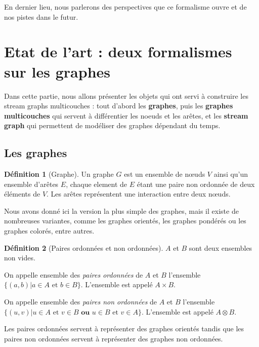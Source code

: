 \documentclass[11pt,a4paper]{article}
\theoremstyle{definition}
\newtheorem{defn}{Définition}
\theoremstyle{remark}
\theoremstyle{remark}
\def \stg {stream graph}
\def \stgms {stream graphs multicouches}
\begin{document}
	En dernier lieu, nous parlerons des perspectives que ce formalisme ouvre et de nos pistes dans le futur.
	
	
	
\section{Etat de l'art : deux formalismes sur les graphes}
\indent

Dans cette partie, nous allons présenter les objets qui ont servi à construire les \stgms{} : tout d'abord les \textbf{graphes}, puis les \textbf{graphes multicouches} qui servent à différentier les noeuds et les arêtes, et les \textbf{\stg{}} qui permettent de modéliser des graphes dépendant du temps.

\subsection{Les graphes}

\begin{defn}[Graphe]
Un graphe $G$ est un ensemble de n\oe{}uds $V$ ainsi qu'un ensemble d'arêtes $E$, chaque element de $E$ étant une paire non ordonnée de deux éléments de $V$. Les arêtes représentent une interaction entre deux n\oe{}uds.
\end{defn}

Nous avons donné ici la version la plus simple des graphes, mais il existe de nombreuses variantes, comme les graphes orientés, les graphes pondérés ou les graphes colorés, entre autres.

\begin{defn}[Paires ordonnées et non ordonnées]
	$A$ et $B$ sont deux ensembles non vides.
	
	On appelle ensemble des \textit{paires ordonnées} de $A$ et $B$ l'ensemble $\{ (a,b) | a \in A \text{ et } b \in B\}$. L'ensemble est appelé $A \times B$.
	
	On appelle ensemble des \textit{paires non ordonnées} de $A$ et $B$ l'ensemble $\{(u,v) | u \in A \text{ et } v\in B \textbf{ ou } u \in B \text{ et } v\in A\}$. L'ensemble est appelé $A\otimes B$.
\end{defn}

	Les paires ordonnées servent à représenter des graphes orientés tandis que les paires non ordonnées servent à représenter des graphes non ordonnées.
\end{document}

